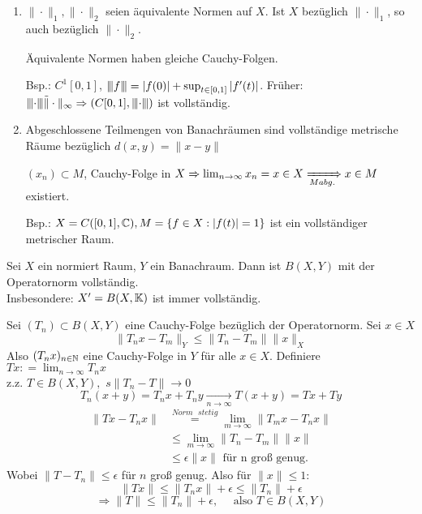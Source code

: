 \begin{bemerkung}
	\begin{enumerate}[label=\alph*\upshape)]
		\item $\| \cdot \|_{1}, \| \cdot \|_{2}$ seien äquivalente Normen auf $X$. Ist $X$ bezüglich $\| \cdot \|_{1}$, so auch bezüglich $\| \cdot \|_{2}$.
			\begin{beweis}
				Äquivalente Normen haben gleiche Cauchy-Folgen.
			\end{beweis}
			Bsp.: $C^{1}[0, 1]$, ${\left\vert\kern-0.25ex\left\vert\kern-0.25ex\left\vert f\right\vert\kern-0.25ex\right\vert\kern-0.25ex\right\vert} = |f(0)| + \sup_{t \in [0, 1]} | f'(t) |$. Früher: ${\left\vert\kern-0.25ex\left\vert\kern-0.25ex\left\vert\cdot\right\vert\kern-0.25ex\right\vert\kern-0.25ex\right\vert} \tilde \| \cdot \|_{\infty} \Rightarrow \left( C[0, 1], {\left\vert\kern-0.25ex\left\vert\kern-0.25ex\left\vert\cdot\right\vert\kern-0.25ex\right\vert\kern-0.25ex\right\vert} \right)$ ist vollständig.
		\item Abgeschlossene Teilmengen von 	Banachräumen sind vollständige metrische Räume bezüglich $d(x, y) = \| x - y\|$
			\begin{beweis}
				$(x_{n}) \subset M$, Cauchy-Folge in $X \Rightarrow \lim_{n \rightarrow \infty} x_{n} = x \in X \xRightarrow[M abg.]{} x \in M$ existiert.	
			\end{beweis}
			Bsp.: $X = C([0, 1], \mathbb{C}), M = \{ f \in X: |f ( t )| = 1 \}$ ist ein vollständiger metrischer Raum.
	\end{enumerate}
\end{bemerkung}



\begin{satz}
	Sei $X$ ein normiert Raum, $Y$ ein Banachraum.
	Dann ist $B(X, Y)$ mit der Operatornorm vollständig. \\
	Insbesondere: $X' = B(X, \mathbb{K})$ ist immer  vollständig.
\end{satz}
\begin{beweis}
	Sei $(T_{n}) \subset B(X, Y)$ eine Cauchy-Folge bezüglich der Operatornorm. Sei $x \in X$
	\[ \| T_{n} x - T_{m} \|_{Y} \leq \| T_{n} - T_{m} \| \|x\|_{X} \]
	Also $(T_{n}x)_{n \in \mathbb{N}}$ eine Cauchy-Folge in $Y$ für alle $x \in X$. Definiere $T x : = \lim_{n \rightarrow \infty} T_{n} x$ \\
	z.z. $T \in B(X, Y),$ $s\| T_{n} - T \| \rightarrow 0$ \\
	\[ T_{n} (x + y)  = T_{n} x + T_{n} y \xrightarrow[n \rightarrow \infty]{} T(x + y) = Tx + Ty \]
	\begin{align*}
		\| Tx - T_{n}x \| & \overset{Norm \text{ } stetig}{=} \lim_{m \rightarrow \infty} \| T_{m} x - T_{n} x \| \\
		 & \leq \lim_{m \rightarrow \infty} \| T_{n} - T_{m} \| \| x \| \\
		 & \leq \epsilon \| x \| \text{ für n gro{\ss} genug.}
	\end{align*}
	Wobei $\| T - T_{n} \| \leq \epsilon$ für $n$ gro{\ss} genug.
	Also für $\| x \| \leq 1$:
	\[ \| T x \| \leq \| T_{n} x \| + \epsilon \leq \| T_{n} \| + \epsilon  \]
	\[ \Rightarrow \| T \| \leq \| T_{n} \| + \epsilon, \quad \text{ also } T \in B(X, Y) \]
\end{beweis}

